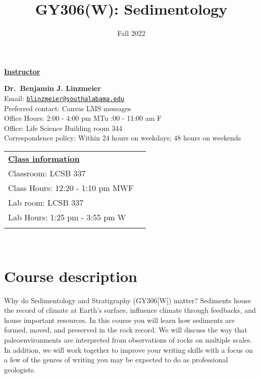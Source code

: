 \documentclass[11pt,]{article}
\title{GY306(W): Sedimentology}
\date{Fall 2022}
\begin{document}
  

		\maketitle
		
	
		\thispagestyle{firststyle}

\textbf{\underline{Instructor}}
\begin{multicols}{2}

  \textbf{Dr.~Benjamin J. Linzmeier}\\
  Email: \href{mailto:blinzmeier@southalabama.edu}{\nolinkurl{blinzmeier@southalabama.edu}}\\
  Preferred contact: Canvas LMS messages\\
  Office Hours: 2:00 - 4:00 pm MTu :00 - 11:00 am F\\
  Office: Life Science Building room 344\\
  Correspondence policy: Within 24 hours on weekdays; 48 hours on
weekends\\
    \columnbreak
    
  \end{multicols}
	
\noindent \begin{tabular*}{\textwidth}{ @{\extracolsep{\fill}} lr @{\extracolsep{\fill}}}
\textbf{\underline{Class information}}\\
  Classroom: LCSB 337\\
  Class Hours: 12:20 - 1:10 pm MWF\\
    Lab room: LCSB 337\\
  Lab Hours: 1:25 pm - 3:55 pm W\\
    \\
	\end{tabular*}\\


\vspace{2mm}


\hypertarget{course-description}{%
\section{Course description}\label{course-description}}

Why do Sedimentology and Stratigraphy (GY306{[}W{]}) matter? Sediments
house the record of climate at Earth's surface, influence climate
through feedbacks, and house important resources. In this course you
will learn how sediments are formed, moved, and preserved in the rock
record. We will discuss the way that paleoenvironments are interpreted
from observations of rocks on multiple scales. In addition, we will work
together to improve your writing skills with a focus on a few of the
genres of writing you may be expected to do as professional geologists.
\end{document}
